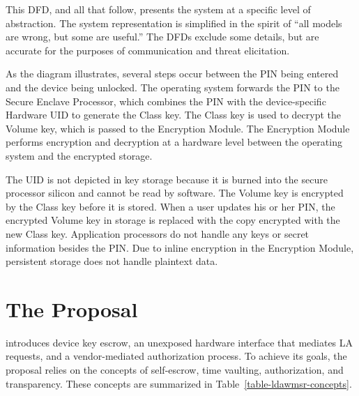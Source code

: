 \documentclass[manuscript,screen,review]{acmart}
\newcommand{\mytab}[1]{Table~\ref{#1}}
\begin{document}
This \ac{DFD}, and all that follow, presents the system at a specific level of abstraction. The system representation is
simplified in the spirit of ``all models are wrong, but some are useful.'' The \acp{DFD} exclude some details, but are
accurate for the purposes of communication and threat elicitation.

As the diagram illustrates, several steps occur between the \ac{PIN} being entered and the device being unlocked. The
operating system forwards the \ac{PIN} to the Secure Enclave Processor, which combines the \ac{PIN} with the
device-specific Hardware \ac{UID} to generate the Class key. The Class key is used to decrypt the Volume key, which is
passed to the Encryption Module. The Encryption Module performs encryption and decryption at a hardware level between
the operating system and the encrypted storage.

The \ac{UID} is not depicted in key storage because it is burned into the secure processor silicon and cannot be read by
software. The Volume key is encrypted by the Class key before it is stored. When a user updates his or her \ac{PIN}, the
encrypted Volume key in storage is replaced with the copy encrypted with the new Class key. Application processors do
not handle any keys or secret information besides the \ac{PIN}. Due to inline encryption in the Encryption Module,
persistent storage does not handle \ac{plaintext} data.


\section{The \ldawmsr Proposal}

\ldawmsr introduces device key escrow, an unexposed hardware interface that mediates \ac{LA} requests, and a
vendor-mediated authorization process. To achieve its goals, the proposal relies on the concepts of self-escrow, time
vaulting, authorization, and transparency. These concepts are summarized in \mytab{table-ldawmsr-concepts}.
\end{document}
